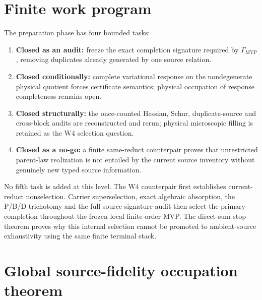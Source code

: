 \documentclass[11pt]{article}
\newcommand{\GMVP}{\Gamma_{\mathrm{MVP}}}
\begin{document}
\section{Finite work program}

The preparation phase has four bounded tasks:
\begin{enumerate}[label={}]
 \item[\textbf{W1}] \textbf{Closed as an audit:} freeze the exact completion
 signature required by \(\GMVP\), removing
 duplicates already generated by one source relation.
 \item[\textbf{W2}] \textbf{Closed conditionally:} complete variational
 response on the nondegenerate physical quotient forces certificate semantics;
 physical occupation of response completeness remains open.
 \item[\textbf{W3}] \textbf{Closed structurally:} the once-counted Hessian,
 Schur, duplicate-source and cross-block audits are reconstructed and rerun;
 physical microscopic filling is retained as the W4 selection question.
 \item[\textbf{W4}] \textbf{Closed as a no-go:} a finite same-reduct
 counterpair proves that unrestricted parent-law realization is not entailed
 by the current
 source inventory without genuinely new typed source information.
\end{enumerate}

No fifth task is added at this level. The W4 counterpair first establishes
current-reduct nonselection. Carrier superselection, exact algebraic
absorption, the P/B/D trichotomy and the full source-signature audit then select
the primary completion throughout the frozen local finite-order MVP. The
direct-sum stop theorem proves why this internal selection cannot be promoted
to ambient-source exhaustivity using the same finite terminal stack.

\section{Global source-fidelity occupation theorem}
\end{document}
